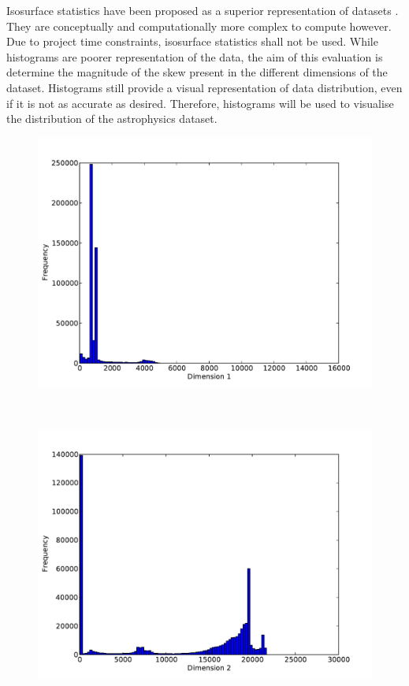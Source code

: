 Isosurface statistics have been proposed as a superior representation of datasets \cite{histograms-and-isosurfaces}. They are conceptually and computationally more complex to compute however. Due to project time constraints, isosurface statistics shall not be used. While histograms are poorer representation of the data, the aim of this evaluation is determine the magnitude of the skew present in the different dimensions of the dataset. Histograms still provide a visual representation of data distribution, even if it is not as accurate as desired. Therefore, histograms will be used to visualise the distribution of the astrophysics dataset.

\begin{figure}
	\begin{center}
		\begin{subfloat}{%
			\includegraphics[scale=0.36]{figures/histograms/astrophysics_500000_0.pdf}
		}
		\end{subfloat}~
		\begin{subfloat}{%
			\includegraphics[scale=0.36]{figures/histograms/astrophysics_500000_1.pdf}
		}
		\end{subfloat}
	\end{center}


\end{figure}
